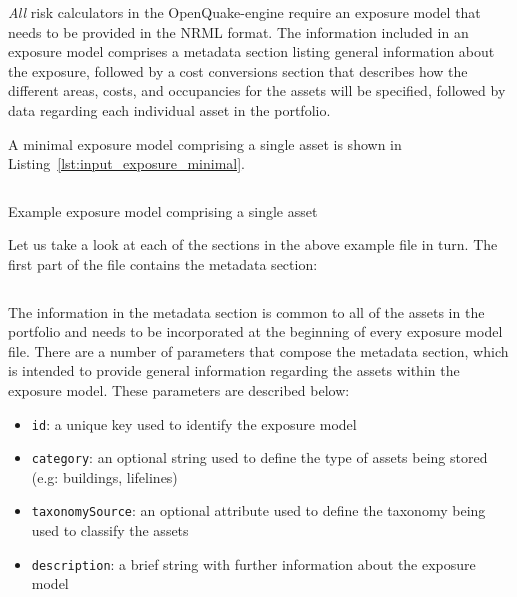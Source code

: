 \emph{All} risk calculators in the OpenQuake-engine require an \gls{exposure
model} that needs to be provided in the NRML format. The information included
in an exposure model comprises a metadata section listing general information
about the exposure, followed by a cost conversions section that describes how
the different areas, costs, and occupancies for the assets will be specified,
followed by data regarding each individual asset in the portfolio.

A minimal exposure model comprising a single asset is shown in Listing~\ref{lst:input_exposure_minimal}.

\begin{listing}[htbp]
  \inputminted[firstline=1,firstnumber=1,fontsize=\footnotesize,frame=single,linenos,bgcolor=lightgray]{xml}{oqum/risk/Verbatim/input_exposure_minimal.xml}
  \caption{Example exposure model comprising a single asset}
  \label{lst:input_exposure_minimal}
\end{listing}

Let us take a look at each of the sections in the above example file in turn.
The first part of the file contains the metadata section:

\inputminted[firstline=5,firstnumber=5,lastline=8,fontsize=\footnotesize,frame=single,linenos,bgcolor=lightgray]{xml}{oqum/risk/Verbatim/input_exposure_minimal.xml}

The information in the metadata section is common to all of the assets in the
portfolio and needs to be incorporated at the beginning of every exposure
model file. There are a number of parameters that compose the metadata
section, which is intended to provide general information regarding the
\glspl{asset} within the \gls{exposure model}. These parameters are described
below:

\begin{itemize}

  \item \Verb+id+: a unique key used to identify the \gls{exposure model}

  \item \Verb+category+: an optional string used to define the type of
    \glspl{asset} being stored (e.g: buildings, lifelines)

  \item \Verb+taxonomySource+: an optional attribute used to define the
    \gls{taxonomy} being used to classify the \glspl{asset}

  \item \Verb+description+: a brief string with further information about the
    \gls{exposure model}

\end{itemize}


